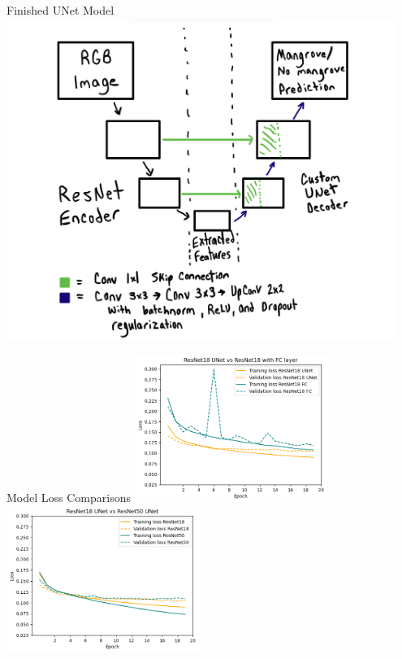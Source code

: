 
\begin{frame}{Finished UNet Model}
    \centering
    \includegraphics[height=0.9\textheight,width=0.95\textwidth,keepaspectratio]{images/mm_ResUNet.jpeg}
\end{frame}

\begin{frame}{Model Loss Comparisons}
    \includegraphics[height=0.7\textheight,width=0.47\textwidth,keepaspectratio]{images/mm_res18_loss.png}
    \hfill
    \includegraphics[height=0.7\textheight,width=0.47\textwidth,keepaspectratio]{images/mm_18v50_Loss.png}
\end{frame}

